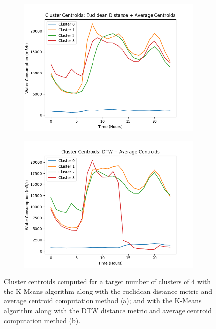 \documentclass[9pt,journal,compsoc]{IEEEtran}
\begin{document}
\begin{figure}[htp]
	\centering
	\begin{subfigure}{0.8\columnwidth}
		\includegraphics[scale=0.4]{images/centroids_reduced_average_4.png}
		\caption{}
	\end{subfigure}\hfill%

	\begin{subfigure}{0.8\columnwidth}
		\includegraphics[scale=0.4]{images/centroids_raw_average_4.png}
		\caption{}
	\end{subfigure}%
	\caption{Cluster centroids computed for a target number of clusters of $4$ with the K-Means algorithm along with the euclidean distance metric and average centroid computation method (a); and with the K-Means algorithm along with the DTW distance metric and average centroid computation method (b).}
	\label{centroids_4clusters}
\end{figure}
\end{document}
